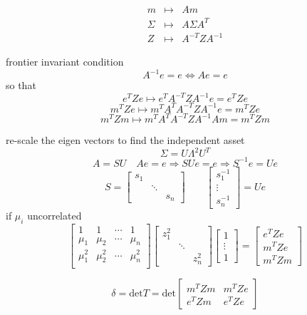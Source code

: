 \documentclass[10pt,a4paper]{article}
\begin{document}
\[
\begin{array}{rcl}
m & \mapsto & Am \\
\Sigma & \mapsto & A \Sigma A^T \\
Z & \mapsto & A^{-T} Z A^{-1}
\end{array}
\]

frontier invariant condition
\[
A^{-1} e = e \Leftrightarrow Ae = e
\]
so that
\[
e^T Z e \mapsto e^T A^{-T} Z A^{-1}e = e^T Z e
\]
\[
m^T Z e \mapsto m^TA^T A^{-T} Z A^{-1} e = m^T Z e
\]
\[
m^T Z m \mapsto m^TA^T A^{-T} Z A^{-1} Am = m^T Z m
\]

re-scale the eigen vectors to find the independent asset
\[
\Sigma = U \Lambda^2 U^T
\]
\[
A = SU \quad Ae = e \Rightarrow SUe = e \Rightarrow S^{-1}e = Ue
\]
\[
S = \left[  \begin{array}{ccc}
    s_{1} & & \\
    & \ddots & \\
    & & s_{n}
\end{array}\right]
\quad \quad
\left[  \begin{array}{c}
    s_{1}^{-1}\\
    \vdots \\
    s_{n}^{-1}
\end{array}\right] = Ue
\]
if $\mu_i$ uncorrelated
\[
\left[
\begin{array}{cccc}
1 & 1 & \cdots & 1 \\
\mu_1 & \mu_2 & \cdots & \mu_n \\
\mu_1^2 & \mu_2^2 & \cdots & \mu_n^2 \\
\end{array}
\right]\left[  \begin{array}{ccc}
    z_{1}^{2} & & \\
    & \ddots & \\
    & & z_{n}^{2}
\end{array}\right]\left[  \begin{array}{c}
    1\\
    \vdots \\
    1
\end{array}\right] = \left[  \begin{array}{c}
    e^TZe\\
    m^TZe \\
    m^TZm
\end{array}\right]
\]

\[
\delta = \mathrm{det}T =\mathrm{det}\left[ \begin{array}{cc}
m^TZm & m^TZe \\ e^TZm & e^TZe
\end{array} \right]
\]
\end{document}
